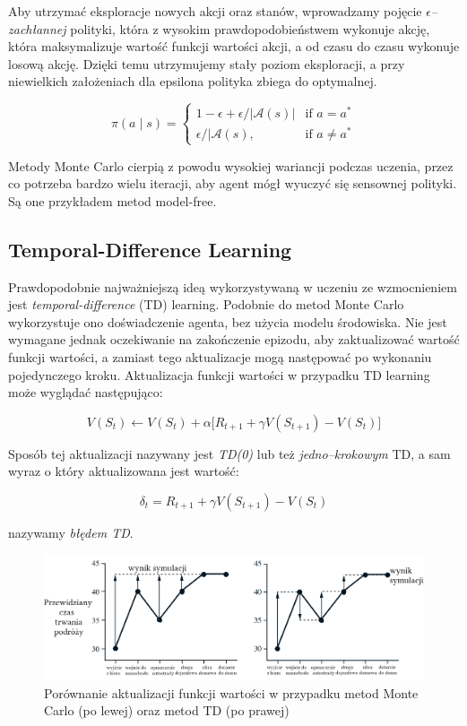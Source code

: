 \documentclass[licencjacka]{pracamgr}
\begin{document}
Aby utrzymać eksploracje nowych akcji oraz stanów, wprowadzamy pojęcie \emph{$\epsilon$--zachłannej} polityki, która z wysokim prawdopodobieństwem wykonuje akcję, która maksymalizuje wartość funkcji wartości akcji, a od czasu do czasu wykonuje losową akcję. Dzięki temu utrzymujemy stały poziom eksploracji, a przy niewielkich założeniach dla epsilona polityka zbiega do optymalnej.

$$
\pi(a \mid s) =
\begin{cases}
    1 - \epsilon + \epsilon/\lvert \mathcal{A}(s) \rvert & \text{if } a = a^\ast \\
    \epsilon/\lvert \mathcal{A}(s),              & \text{if } a\neq a^\ast
\end{cases}
$$

Metody Monte Carlo cierpią z powodu wysokiej wariancji podczas uczenia, przez co potrzeba bardzo wielu iteracji, aby agent mógł wyuczyć się sensownej polityki. Są one przykładem metod model-free.

\subsection{Temporal-Difference Learning} 

Prawdopodobnie najważniejszą ideą wykorzystywaną  w uczeniu ze wzmocnieniem jest \emph{temporal-difference} (TD) learning. Podobnie do metod Monte Carlo wykorzystuje ono doświadczenie agenta, bez użycia modelu środowiska. Nie jest wymagane jednak oczekiwanie na zakończenie epizodu, aby zaktualizować wartość funkcji wartości, a zamiast tego aktualizacje mogą następować po wykonaniu pojedynczego kroku. Aktualizacja funkcji wartości w przypadku TD learning może wyglądać następująco:

$$ V(S_t) \leftarrow V(S_t) + \alpha \big[R_{t+1} + \gamma V(S_{t+1}) - V(S_t) \big] $$

Sposób tej aktualizacji nazywany jest \emph{TD(0)} lub też \emph{jedno--krokowym} TD, a sam wyraz o który aktualizowana jest wartość:

$$ \delta_t = R_{t+1} + \gamma V(S_{t+1}) - V(S_t) $$

nazywamy \emph{błędem TD}.

\begin{figure}[ht]
  \centering
  \includegraphics[width=1.0\textwidth]{mc_td}
  \caption{Porównanie aktualizacji funkcji wartości w przypadku metod Monte Carlo (po lewej) oraz metod TD (po prawej)}
\end{figure}
\end{document}
